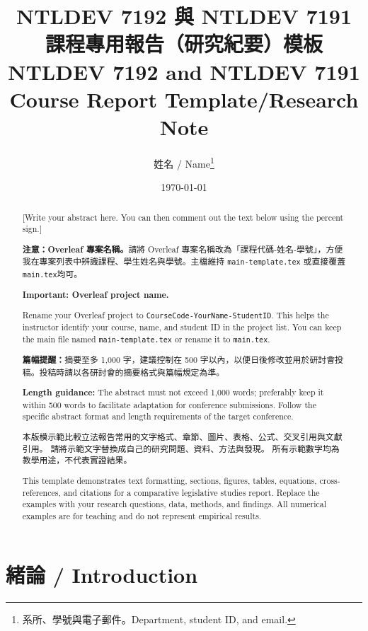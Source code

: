 \documentclass[11pt,a4paper]{article}
\title{\textbf{NTLDEV 7192 與 NTLDEV 7191}\\課程專用報告（研究紀要）模板\\[0.8em]\textbf{NTLDEV 7192 and NTLDEV 7191}\\Course Report Template/Research Note}
\author{姓名 / Name\thanks{系所、學號與電子郵件。Department, student ID, and email.}}
\date{\today}
\begin{document}
\maketitle
\clearpage
\begin{abstract}

[Write your abstract here. You can then comment out the text below using the percent sign.]


\begingroup
\color{red}
\noindent\textbf{注意：Overleaf 專案名稱。}請將 Overleaf 專案名稱改為「課程代碼-姓名-學號」，方便我在專案列表中辨識課程、學生姓名與學號。主檔維持 \texttt{main-template.tex} 或直接覆蓋\texttt{main.tex}均可。

\noindent\textbf{Important: Overleaf project name.} 

Rename your Overleaf project to \texttt{CourseCode-YourName-StudentID}. This helps the instructor identify your course, name, and student ID in the project list. You can keep the main file named \texttt{main-template.tex} or rename it to \texttt{main.tex}.

\par
\endgroup
\medskip

\noindent\textbf{篇幅提醒：}摘要至多 1,000 字，建議控制在 500 字以內，以便日後修改並用於研討會投稿。投稿時請以各研討會的摘要格式與篇幅規定為準。

\noindent\textbf{Length guidance:} The abstract must not exceed 1,000 words; preferably keep it within 500 words to facilitate adaptation for conference submissions. Follow the specific abstract format and length requirements of the target conference.

\medskip
本版模示範比較立法報告常用的文字格式、章節、圖片、表格、公式、交叉引用與文獻引用。
請將示範文字替換成自己的研究問題、資料、方法與發現。
所有示範數字均為教學用途，不代表實證結果。

This template demonstrates text formatting, sections, figures, tables, equations, cross-references, and citations for a comparative legislative studies report. Replace the examples with your research questions, data, methods, and findings. All numerical examples are for teaching and do not represent empirical results.
\end{abstract}
\clearpage
\tableofcontents
\clearpage

\section{緒論 / Introduction}
\label{sec:introduction}
\end{document}
